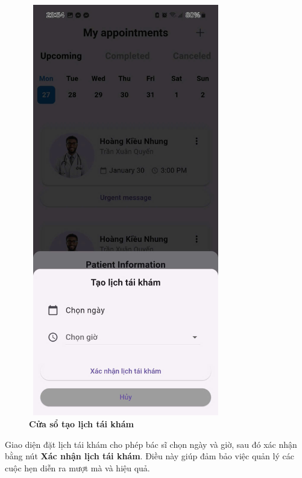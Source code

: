 \begin{figure}[H]
	\centering
	\includegraphics[width=8.5cm,height=18cm]{Images/AppUI/repickSchedule2.jpg}
	\caption[Cửa sổ tạo lịch tái khám]{\bfseries \fontsize{12pt}{0pt}\selectfont Cửa sổ tạo lịch tái khám}
	\label{reschedule}
\end{figure}
Giao diện đặt lịch tái khám cho phép bác sĩ chọn ngày và giờ, sau đó xác nhận bằng nút \textbf{Xác nhận lịch tái khám}. Điều này giúp đảm bảo việc quản lý các cuộc hẹn diễn ra mượt mà và hiệu quả.

